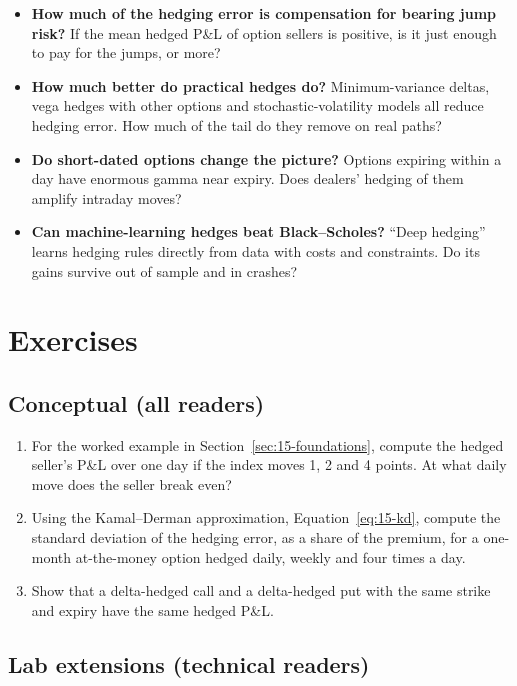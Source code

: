 \begin{itemize}
  \item \textbf{How much of the hedging error is compensation for bearing jump risk?} If the mean hedged P\&L of option sellers is positive, is it just enough to pay for the jumps, or more?
  \item \textbf{How much better do practical hedges do?} Minimum-variance deltas, vega hedges with other options and stochastic-volatility models all reduce hedging error. How much of the tail do they remove on real paths?
  \item \textbf{Do short-dated options change the picture?} Options expiring within a day have enormous gamma near expiry. Does dealers' hedging of them amplify intraday moves?
  \item \textbf{Can machine-learning hedges beat Black--Scholes?} ``Deep hedging'' learns hedging rules directly from data with costs and constraints. Do its gains survive out of sample and in crashes?
\end{itemize}

\section*{Exercises}

\subsection*{Conceptual (all readers)}

\begin{enumerate}
  \item For the worked example in Section~\ref{sec:15-foundations}, compute the hedged seller's P\&L over one day if the index moves 1, 2 and 4 points. At what daily move does the seller break even?
  \item Using the Kamal--Derman approximation, Equation~\eqref{eq:15-kd}, compute the standard deviation of the hedging error, as a share of the premium, for a one-month at-the-money option hedged daily, weekly and four times a day.
  \item Show that a delta-hedged call and a delta-hedged put with the same strike and expiry have the same hedged P\&L.
\end{enumerate}

\subsection*{Lab extensions (technical readers)}

